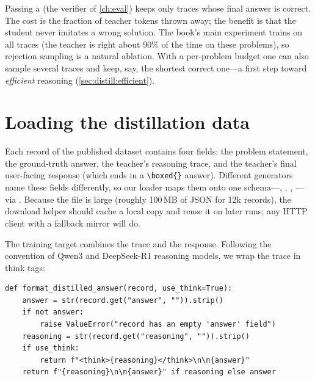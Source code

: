 \begin{systemslens}
Passing a  (the verifier of \cref{ch:eval}) keeps only traces whose final
answer is correct. The cost is the fraction of teacher tokens thrown away; the benefit is that
the student never imitates a wrong solution. The book's main experiment trains on all traces
(the teacher is right about 90\% of the time on these problems), so rejection sampling is a
natural ablation. With a per-problem budget one can also sample several traces and keep, say,
the shortest correct one---a first step toward \emph{efficient} reasoning
(\cref{sec:distill:efficient}).
\end{systemslens}

\section{Loading the distillation data}\label{sec:distill:load}

Each record of the published dataset contains four fields: the problem statement, the
ground-truth answer, the teacher's reasoning trace, and the teacher's final user-facing
response (which ends in a \texttt{\textbackslash boxed\{\}} answer). Different generators name these fields
differently, so our loader maps them onto one schema---, ,
, ---via . Because the file is large
(roughly 100\,MB of JSON for 12k records), the download helper should cache a local copy and
reuse it on later runs; any HTTP client with a fallback mirror will do.

The training target combines the trace and the response. Following the convention of Qwen3
and DeepSeek-R1 reasoning models, we wrap the trace in think tags:

\begin{lstlisting}[caption={Turning a teacher record into the student's target text.},
label={lst:distill:format}]
def format_distilled_answer(record, use_think=True):
    answer = str(record.get("answer", "")).strip()
    if not answer:
        raise ValueError("record has an empty 'answer' field")
    reasoning = str(record.get("reasoning", "")).strip()
    if use_think:
        return f"<think>{reasoning}</think>\n\n{answer}"
    return f"{reasoning}\n\n{answer}" if reasoning else answer
\end{lstlisting}

